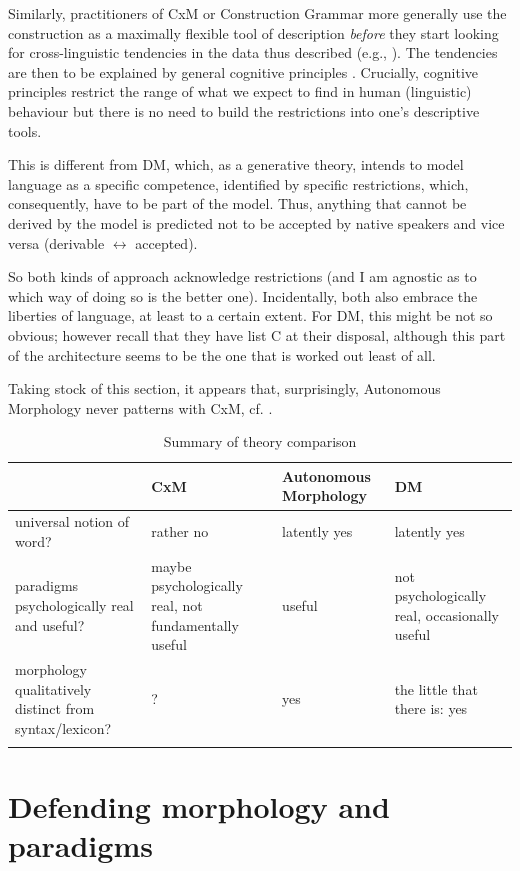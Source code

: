 \documentclass[output=paper]{langsci/langscibook}
\begin{document}
Similarly, practitioners of CxM or Construction Grammar more generally use the construction as a maximally flexible tool of description \textit{before} they start looking for cross-linguistic tendencies in the data thus described (e.g., \citealt[ch. 7–9]{Goldberg2006}). The tendencies are then to be explained by general cognitive principles \citep{Goldberg2006}. Crucially, cognitive principles restrict the range of what we expect to find in human (linguistic) behaviour but there is no need to build the restrictions into one’s descriptive tools.

This is different from DM, which, as a generative theory, intends to model language as a specific competence, identified by specific restrictions, which, consequently, have to be part of the model. Thus, anything that cannot be derived by the model is predicted not to be accepted by native speakers and vice versa (derivable $\leftrightarrow $ accepted).

So both kinds of approach acknowledge restrictions (and I am agnostic as to which way of doing so is the better one). Incidentally, both also embrace the liberties of language, at least to a certain extent. For DM, this might be not so obvious; however recall that they have list C at their disposal, although this part of the architecture seems to be the one that is worked out least of all.

Taking stock of this section, it appears that, surprisingly, Autonomous Morphology never patterns with CxM, cf. .

\begin{table}
\caption{Summary of theory comparison\label{tab:reiner:9}}
\begin{tabularx}{\textwidth}{QQQQ}
\lsptoprule
& {CxM} & {Autonomous Morphology} & {DM}\\
\midrule
{universal} {notion} {of} {word?} & rather no & latently yes & latently yes\\\tablevspace
{paradigms} {psychologically} {real} {and} {useful?} & maybe psychologically real, not fundamentally useful & useful & not psychologically real, occasionally useful\\\tablevspace
{morphology} {qualitatively} {distinct} {from} {syntax/lexicon?} & ? & yes & the little that there is: yes\\
\lspbottomrule
\end{tabularx}
\end{table}


\section{Defending morphology and paradigms} \label{reiner:3}
\end{document}
